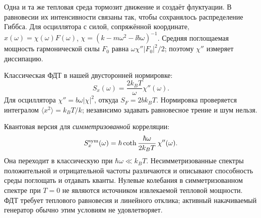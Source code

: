 
Одна и та же тепловая среда тормозит движение и создаёт флуктуации. В равновесии их интенсивности связаны так, чтобы сохранялось распределение Гиббса. Для осциллятора с силой, сопряжённой координате, $x(\omega)=\chi(\omega)F(\omega)$, $\chi=(k-m\omega^2-\ii b\omega)^{-1}$. Средняя поглощаемая мощность гармонической силы $F_0$ равна $\omega\chi''|F_0|^2/2$; поэтому $\chi''$ измеряет диссипацию.

Классическая ФДТ в нашей двусторонней нормировке:
\begin{equation}\label{eq:fdt}
 S_x(\omega)=\frac{2k_BT}{\omega}\chi''(\omega).
\end{equation}
Для осциллятора $\chi''=b\omega|\chi|^2$, откуда $S_F=2bk_BT$. Нормировка проверяется интегралом $\langle x^2\rangle=k_BT/k$; независимо задавать равновесное трение и шум нельзя.

Квантовая версия для \emph{симметризованной} корреляции:
\begin{equation}
 S_x^{\rm sym}(\omega)=\hbar\coth\frac{\hbar\omega}{2k_BT}\,\chi''(\omega).
\end{equation}
Она переходит в классическую при $\hbar\omega\ll k_BT$. Несимметризованные спектры положительной и отрицательной частоты различаются и описывают способность среды поглощать и отдавать кванты. Нулевые колебания в симметризованном спектре при $T=0$ не являются источником извлекаемой тепловой мощности. ФДТ требует теплового равновесия и линейного отклика; активный накачиваемый генератор обычно этим условиям не удовлетворяет.
